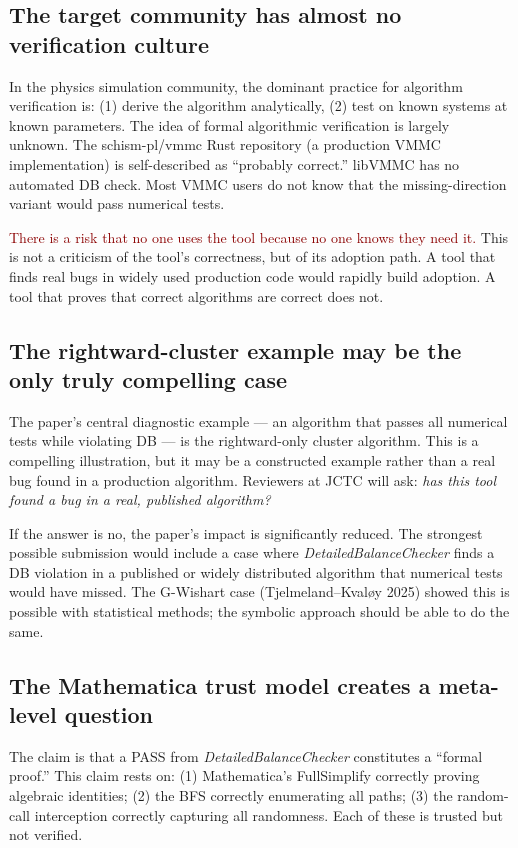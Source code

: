 \documentclass[11pt,a4paper]{article}
\newcommand{\bad}[1]{\textcolor{darkred}{#1}}
\newcommand{\DBC}{\textit{DetailedBalanceChecker}}
\begin{document}
\subsection{The target community has almost no verification culture}

In the physics simulation community, the dominant practice for algorithm
verification is: (1) derive the algorithm analytically, (2) test on known systems
at known parameters.  The idea of formal algorithmic verification is largely
unknown.  The schism-pl/vmmc Rust repository (a production VMMC implementation)
is self-described as ``probably correct.''  libVMMC has no automated DB check.
Most VMMC users do not know that the missing-direction variant would pass numerical
tests.

\bad{There is a risk that no one uses the tool because no one knows they need it.}
This is not a criticism of the tool's correctness, but of its adoption path.
A tool that finds real bugs in widely used production code would rapidly build
adoption.  A tool that proves that correct algorithms are correct does not.

\subsection{The rightward-cluster example may be the only truly compelling case}

The paper's central diagnostic example — an algorithm that passes all numerical
tests while violating DB — is the rightward-only cluster algorithm.  This is a
compelling illustration, but it may be a constructed example rather than a real
bug found in a production algorithm.  Reviewers at JCTC will ask: \emph{has this
tool found a bug in a real, published algorithm?}

If the answer is no, the paper's impact is significantly reduced.  The strongest
possible submission would include a case where \DBC{} finds a DB violation in a
published or widely distributed algorithm that numerical tests would have missed.
The G-Wishart case (Tjelmeland--Kvaløy 2025) showed this is possible with
statistical methods; the symbolic approach should be able to do the same.

\subsection{The Mathematica trust model creates a meta-level question}

The claim is that a PASS from \DBC{} constitutes a ``formal proof.''  This claim
rests on: (1) Mathematica's FullSimplify correctly proving algebraic identities;
(2) the BFS correctly enumerating all paths; (3) the random-call interception
correctly capturing all randomness.  Each of these is trusted but not verified.
\end{document}
